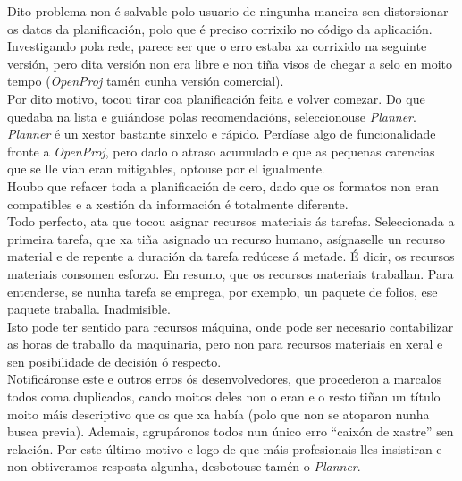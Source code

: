   Dito problema non é salvable polo usuario de ningunha maneira sen
  distorsionar os datos da planificación, polo que é preciso corrixilo no
  código da aplicación. Investigando pola rede, parece ser que o erro estaba xa
  corrixido na seguinte versión, pero dita versión non era libre e non tiña
  visos de chegar a selo en moito tempo (\textit{OpenProj} tamén cunha versión
  comercial). \\

  Por dito motivo, tocou tirar coa planificación feita e volver comezar. Do que
  quedaba na lista e guiándose polas recomendacións, seleccionouse
  \textit{Planner}. \\

  \textit{Planner} é un xestor bastante sinxelo e rápido. Perdíase algo de
  funcionalidade fronte a \textit{OpenProj}, pero dado o atraso acumulado e que
  as pequenas carencias que se lle vían eran mitigables, optouse por el
  igualmente. \\

  Houbo que refacer toda a planificación de cero, dado que os formatos non eran
  compatibles e a xestión da información é totalmente diferente. \\

  Todo perfecto, ata que tocou asignar recursos materiais ás tarefas.
  Seleccionada a primeira tarefa, que xa tiña asignado un recurso humano,
  asígnaselle un recurso material e de repente a duración da tarefa redúcese á
  metade. É dicir, os recursos materiais consomen esforzo. En resumo, que os
  recursos materiais traballan. Para entenderse, se nunha tarefa se emprega,
  por exemplo, un paquete de folios, ese paquete traballa. Inadmisible. \\

  Isto pode ter sentido para recursos máquina, onde pode ser necesario
  contabilizar as horas de traballo da maquinaria, pero non para recursos
  materiais en xeral e sen posibilidade de decisión ó respecto.\\

  Notificáronse este e outros erros ós desenvolvedores, que procederon a
  marcalos todos coma duplicados, cando moitos deles non o eran e o resto tiñan
  un título moito máis descriptivo que os que xa había (polo que non se
  atoparon nunha busca previa). Ademais, agrupáronos todos nun único erro
  ``caixón de xastre'' sen relación. Por este último motivo e logo de que máis
  profesionais lles insistiran e non obtiveramos resposta algunha, desbotouse
  tamén o \textit{Planner}.\\

